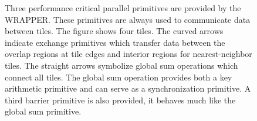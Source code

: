 \begin{figure}
\begin{center}
\end{center}
\caption{Three performance critical parallel primitives are provided
  by the WRAPPER. These primitives are always used to communicate data
  between tiles. The figure shows four tiles. The curved arrows
  indicate exchange primitives which transfer data between the overlap
  regions at tile edges and interior regions for nearest-neighbor
  tiles.  The straight arrows symbolize global sum operations which
  connect all tiles.  The global sum operation provides both a key
  arithmetic primitive and can serve as a synchronization primitive. A
  third barrier primitive is also provided, it behaves much like the
  global sum primitive.  } \label{fig:communication_primitives}
\end{figure}


